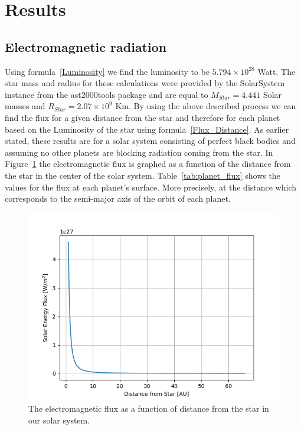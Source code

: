 \documentclass[reprint,english,notitlepage]{revtex4-2}
\begin{document}
\section{Results} \label{sec:results}
	\subsection{Electromagnetic radiation} \label{subsec:res_elmag_radiation}
	Using formula~\eqref{Luminosity} we find the luminosity to be $5.794 \times 10^{28}$ Watt.
	The star mass and radius for these calculations were provided by the SolarSystem instance from the ast2000tools package and are equal to $M_{Star} = 4.441$ Solar masses and $R_{Star} = 2.07 \times 10^9$ Km.
	By using the above described process we can find the flux for a given distance from the star and therefore for each planet based on the Luminosity of the star using formula~\eqref{Flux_Distance}.
	As earlier stated, these results are for a solar system consisting of perfect black bodies and assuming no other planets are blocking radiation coming from the star.
	In Figure~\ref{fig:Radius_Flux} the electromagnetic flux is graphed as a function of the distance from the star in the center of the solar system.
	Table~\ref{tab:planet_flux} shows the values for the flux at each planet's surface.
	More precisely, at the distance which corresponds to the semi-major axis of the orbit of each planet.

	\begin{figure}[h]
		\centering
		\includegraphics[scale=0.4]{Figures/Radius_flux}
		\caption{The electromagnetic flux as a function of distance from the star in our solar system.}\label{fig:Radius_Flux}
	\end{figure}
\end{document}
